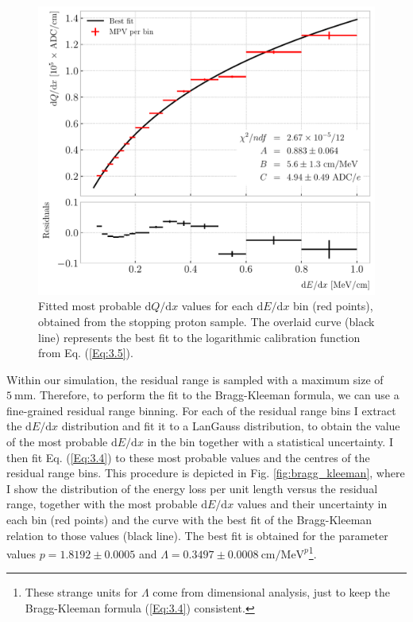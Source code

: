 \begin{figure}[t]
	\centering
	\includegraphics[width=.85\linewidth]{Images/GArSoft_PID/dEdx/dEdx_vs_dQdx_log_fit.pdf}
	\caption[Fitted most probable $\mathrm{d}Q/\mathrm{d}x$ values for each $\mathrm{d}E/\mathrm{d}x$ bin, together with best fit to the logarithmic calibration function.]{Fitted most probable $\mathrm{d}Q/\mathrm{d}x$ values for each $\mathrm{d}E/\mathrm{d}x$ bin (red points), obtained from the stopping proton sample. The overlaid curve (black line) represents the best fit to the logarithmic calibration function from Eq. (\ref{Eq:3.5}).}
	\label{fig:energy_calibration}
\end{figure}

Within our simulation, the residual range is sampled with a maximum size of $5~\mathrm{mm}$. Therefore, to perform the fit to the Bragg-Kleeman formula, we can use a fine-grained residual range binning. For each of the residual range bins I extract the $\mathrm{d}E/\mathrm{d}x$ distribution and fit it to a LanGauss distribution, to obtain the value of the most probable $\mathrm{d}E/\mathrm{d}x$ in the bin together with a statistical uncertainty. I then fit Eq. (\ref{Eq:3.4}) to these most probable values and the centres of the residual range bins. This procedure is depicted in Fig. \ref{fig:bragg_kleeman}, where I show the distribution of the energy loss per unit length versus the residual range, together with the most probable $\mathrm{d}E/\mathrm{d}x$ values and their uncertainty in each bin (red points) and the curve with the best fit of the Bragg-Kleeman relation to those values (black line). The best fit is obtained for the parameter values $p = 1.8192 \pm 0.0005$ and $\Lambda = 0.3497 \pm 0.0008~\mathrm{cm}/\mathrm{MeV}^{p}$\footnote{These strange units for $\Lambda$ come from dimensional analysis, just to keep the Bragg-Kleeman formula (\ref{Eq:3.4}) consistent.}.

